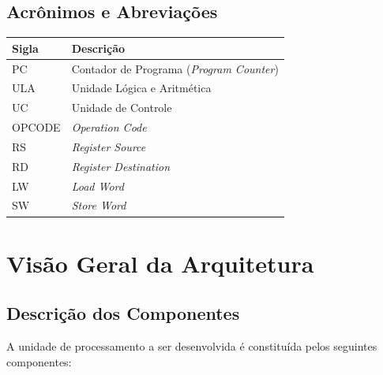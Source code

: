 \documentclass{report}
\begin{document}
  \section{Acrônimos e Abreviações}
    \FloatBarrier
    \begin{table}[H]
      \begin{center}
        \begin{tabular}[pos]{|m{2cm} | m{12cm}|} 
          \hline
          \cellcolor[gray]{0.9}\textbf{Sigla} & \cellcolor[gray]{0.9}\textbf{Descrição} \\ \hline
             PC       &  Contador de Programa (\textit{Program Counter})\\ \hline
             ULA      &  Unidade Lógica e Aritmética\\ \hline
             UC      &  Unidade de Controle\\ \hline
             OPCODE  &  \textit{Operation Code}\\ \hline
             RS      &  \textit{Register Source}\\ \hline
             RD      &  \textit{Register Destination}\\ \hline
             LW      &  \textit{Load Word}\\ \hline
             SW      &  \textit{Store Word}\\ \hline
        \end{tabular}
      \end{center}
    \end{table}  

\chapter{Visão Geral da Arquitetura}
  \section{Descrição dos Componentes}
  A unidade de processamento a ser desenvolvida é constituída pelos seguintes componentes:
  
\end{document}
